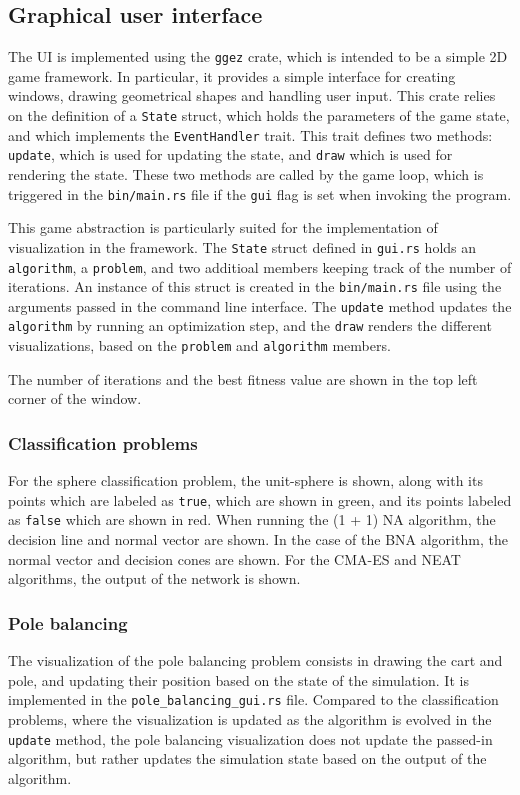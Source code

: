 \subsection{Graphical user interface}

The UI is implemented using the \texttt{ggez} crate, which is intended to be a simple 2D game framework.
In particular, it provides a simple interface for creating windows, drawing geometrical shapes and handling user input.
This crate relies on the definition of a \texttt{State} struct, which holds the parameters of the game state, and which implements the \texttt{EventHandler} trait.
This trait defines two methods: \texttt{update}, which is used for updating the state, and \texttt{draw} which is used for rendering the state.
These two methods are called by the game loop, which is triggered in the \texttt{bin/main.rs} file if the \texttt{gui} flag is set when invoking the program.

This game abstraction is particularly suited for the implementation of visualization in the framework.
The \texttt{State} struct defined in \texttt{gui.rs} holds an \texttt{algorithm}, a \texttt{problem}, and two additioal members keeping track of the number of iterations.
An instance of this struct is created in the \texttt{bin/main.rs} file using the arguments passed in the command line interface.
The \texttt{update} method updates the \texttt{algorithm} by running an optimization step, and the \texttt{draw} renders the different visualizations, based on
the \texttt{problem} and \texttt{algorithm} members.

The number of iterations and the best fitness value are shown in the top left corner of the window.

\subsubsection{Classification problems}

For the sphere classification problem, the unit-sphere is shown, along with its points which are labeled as \texttt{true}, which are shown in green, and its points
labeled as \texttt{false} which are shown in red. When running the (1 + 1) NA algorithm, the decision line and normal vector are shown. In the case of the BNA algorithm,
the normal vector and decision cones are shown. For the CMA-ES and NEAT algorithms, the output of the network is shown.


\subsubsection{Pole balancing}

The visualization of the pole balancing problem consists in drawing the cart and pole, and updating their position based on the state of the simulation.
It is implemented in the \texttt{pole\_balancing\_gui.rs} file. Compared to the classification problems, where the visualization is updated as the algorithm is evolved in the \texttt{update} method,
the pole balancing visualization does not update the passed-in algorithm, but rather updates the simulation state based on the output of the algorithm.

